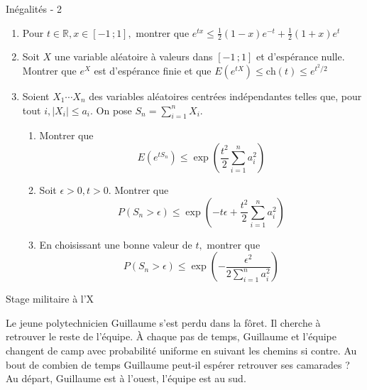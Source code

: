 \documentclass[french, a4paper, 11pt]{article}
\newcommand{\R}{\mathbb{R}}   %
\newcommand{\interff}[2]{\left[#1\,;#2\right]}   %
\begin{document}
\begin{cadre}{Inégalités - 2}
  \begin{enumerate}
    \item Pour \(t \in \R, x \in \interff{-1}{1},\) montrer que \(e^{tx} \leq \frac{1}{2}(1-x)e^{-t} + \frac{1}{2}(1+x)e^t\)
    \item Soit \(X\) une variable aléatoire à valeurs dans \(\interff{-1}{1}\) et d'espérance nulle. Montrer que \(e^{X}\) est d'espérance finie
          et que \(E(e^{tX}) \leq \mathrm{ch}(t) \leq e^{t^2/2}\)
    \item Soient \(X_1 \cdots X_n\) des variables aléatoires centrées indépendantes telles que,
          pour tout \(i, |X_i| \leq a_i.\) On pose \(S_n=\sum_{i=1}^{n}X_i.\)
          \begin{enumerate}
            \item Montrer que \[E(e^{tS_n}) \leq \exp\left(\frac{t^2}{2} \sum_{i=1}^{n}a_i^2\right)\]
            \item Soit \(\epsilon > 0, t > 0.\) Montrer que 
                    \[P(S_n > \epsilon) \leq \exp\left(-t\epsilon + \frac{t^2}{2} \sum_{i=1}^{n} a_i^2\right)\]
            \item En choisissant une bonne valeur de \(t,\) montrer que
                    \[P(S_n > \epsilon) \leq \exp\left(-\dfrac{\epsilon^2}{2\sum_{i=1}^{n} a_i^2}\right)\]
          \end{enumerate}
  \end{enumerate}
\end{cadre}

\begin{cadre}{Stage militaire à l'X}
  \begin{minipage}{0.85\linewidth}
  Le jeune polytechnicien Guillaume s'est perdu dans la fôret. Il cherche à retrouver le reste de l'équipe. À chaque pas de temps, Guillaume et l'équipe changent de camp avec probabilité uniforme en suivant les chemins si contre. Au bout de combien de temps Guillaume peut-il espérer retrouver ses camarades ? Au départ, Guillaume est à l'ouest, l'équipe est au sud.
  \end{minipage}
  \begin{minipage}{0.1\linewidth}
  \end{minipage}
\end{cadre}
\end{document}
